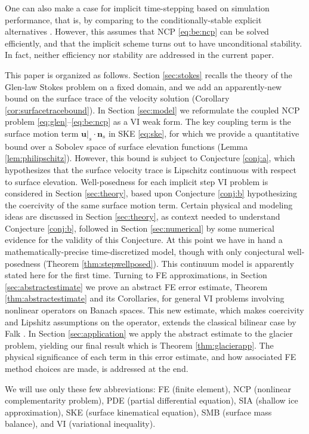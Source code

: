 \documentclass[hidelinks,onefignum,onetabnum,final]{siamart220329}  %
\newcommand{\bn}{\mathbf{n}}
\newcommand{\bu}{\mathbf{u}}
\begin{document}
One can also make a case for implicit time-stepping based on simulation performance, that is, by comparing to the conditionally-stable explicit alternatives \cite{Bueler2023}.  However, this assumes that NCP \eqref{eq:be:ncp} can be solved efficiently, and that the implicit scheme turns out to have unconditional stability.  In fact, neither efficiency nor stability are addressed in the current paper.

This paper is organized as follows.  Section \ref{sec:stokes} recalls the theory of the Glen-law Stokes problem on a fixed domain, and we add an apparently-new bound on the surface trace of the velocity solution (Corollary \ref{cor:surfacetracebound}).  In Section \ref{sec:model} we reformulate the coupled NCP problem \eqref{eq:glen}--\eqref{eq:be:ncp} as a VI weak form.  The key coupling term is the surface motion term $\bu|_s\cdot \bn_s$ in SKE \eqref{eq:ske}, for which we provide a quantitative bound over a Sobolev space of surface elevation functions (Lemma \ref{lem:philipschitz}).  However, this bound is subject to Conjecture \ref{conj:a}, which hypothesizes that the surface velocity trace is Lipschitz continuous with respect to surface elevation.  Well-posedness for each implicit step VI problem is considered in Section \ref{sec:theory}, based upon Conjecture \ref{conj:b} hypothesizing the coercivity of the same surface motion term.  Certain physical and modeling ideas are discussed in Section \ref{sec:theory}, as context needed to understand Conjecture \ref{conj:b}, followed in Section \ref{sec:numerical} by some numerical evidence for the validity of this Conjecture.  At this point we have in hand a mathematically-precise time-discretized model, though with only conjectural well-posedness  (Theorem \ref{thm:stepwellposed}).  This continuum model is apparently stated here for the first time.  Turning to FE approximations, in Section \ref{sec:abstractestimate} we prove an abstract FE error estimate, Theorem \ref{thm:abstractestimate} and its Corollaries, for general VI problems involving nonlinear operators on Banach spaces.  This new estimate, which makes coercivity and Lipshitz assumptions on the operator, extends the classical bilinear case by Falk \cite{Falk1974}.  In Section \ref{sec:application} we apply the abstract estimate to the glacier problem, yielding our final result which is Theorem \ref{thm:glacierapp}.  The physical significance of each term in this error estimate, and how associated FE method choices are made, is addressed at the end.

We will use only these few abbreviations: FE (finite element), NCP (nonlinear complementarity problem), PDE (partial differential equation), SIA (shallow ice approximation), SKE (surface kinematical equation), SMB (surface mass balance), and VI (variational inequality).
\end{document}
